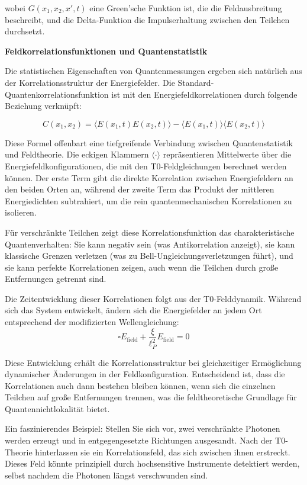 \documentclass[12pt,a4paper]{article}
\newcommand{\xipar}{\xi}
\theoremstyle{definition}
\theoremstyle{remark}
\begin{document}
wobei $G(x_1,x_2,x',t)$ eine Green'sche Funktion ist, die die Feldausbreitung beschreibt, und die Delta-Funktion die Impulserhaltung zwischen den Teilchen durchsetzt.

\textbf{Feldkorrelationsfunktionen und Quantenstatistik}

Die statistischen Eigenschaften von Quantenmessungen ergeben sich natürlich aus der Korrelationsstruktur der Energiefelder. Die Standard-Quantenkorrelationsfunktion ist mit den Energiefeldkorrelationen durch folgende Beziehung verknüpft:

\begin{equation}
	C(x_1,x_2) = \langle E(x_1,t) E(x_2,t) \rangle - \langle E(x_1,t) \rangle \langle E(x_2,t) \rangle
	\label{eq:field_correlation_function}
\end{equation}

Diese Formel offenbart eine tiefgreifende Verbindung zwischen Quantenstatistik und Feldtheorie. Die eckigen Klammern $\langle \cdot \rangle$ repräsentieren Mittelwerte über die Energiefeldkonfigurationen, die mit den T0-Feldgleichungen berechnet werden können. Der erste Term gibt die direkte Korrelation zwischen Energiefeldern an den beiden Orten an, während der zweite Term das Produkt der mittleren Energiedichten subtrahiert, um die rein quantenmechanischen Korrelationen zu isolieren.

Für verschränkte Teilchen zeigt diese Korrelationsfunktion das charakteristische Quantenverhalten: Sie kann negativ sein (was Antikorrelation anzeigt), sie kann klassische Grenzen verletzen (was zu Bell-Ungleichungsverletzungen führt), und sie kann perfekte Korrelationen zeigen, auch wenn die Teilchen durch große Entfernungen getrennt sind.

Die Zeitentwicklung dieser Korrelationen folgt aus der T0-Felddynamik. Während sich das System entwickelt, ändern sich die Energiefelder an jedem Ort entsprechend der modifizierten Wellengleichung:
$$\square E_{\text{field}} + \frac{\xipar}{\ell_P^2} E_{\text{field}} = 0$$

Diese Entwicklung erhält die Korrelationsstruktur bei gleichzeitiger Ermöglichung dynamischer Änderungen in der Feldkonfiguration. Entscheidend ist, dass die Korrelationen auch dann bestehen bleiben können, wenn sich die einzelnen Teilchen auf große Entfernungen trennen, was die feldtheoretische Grundlage für Quantennichtlokalität bietet.

Ein faszinierendes Beispiel: Stellen Sie sich vor, zwei verschränkte Photonen werden erzeugt und in entgegengesetzte Richtungen ausgesandt. Nach der T0-Theorie hinterlassen sie ein Korrelationsfeld, das sich zwischen ihnen erstreckt. Dieses Feld könnte prinzipiell durch hochsensitive Instrumente detektiert werden, selbst nachdem die Photonen längst verschwunden sind.
\end{document}
